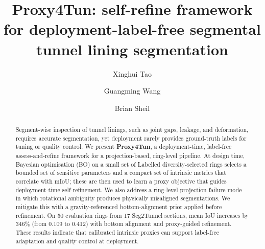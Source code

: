 \documentclass[a4paper,fleqn]{cas-dc}
\begin{document}
\let\WriteBookmarks\relax
\def\floatpagepagefraction{1}
\def\textpagefraction{.001}


{

\title[mode=title]{Proxy4Tun: self-refine framework for deployment-label-free segmental tunnel lining segmentation}

\author[1]{Xinghui Tao}

\author[1]{Guangming Wang}
\cormark[1]

\author[1]{Brian Sheil}





\begin{abstract}
Segment-wise inspection of tunnel linings, such as joint gaps, leakage, and deformation, requires accurate segmentation, yet deployment rarely provides ground-truth labels for tuning or quality control. We present \textbf{Proxy4Tun}, a deployment-time, label-free assess-and-refine framework for a projection-based, ring-level pipeline. At design time, Bayesian optimisation (BO) on a small set of Labelled diversity-selected rings selects a bounded set of sensitive parameters and a compact set of intrinsic metrics that correlate with mIoU; these are then used to learn a proxy objective that guides deployment-time self-refinement. We also address a ring-level projection failure mode in which rotational ambiguity produces physically misaligned segmentations. We mitigate this with a gravity-referenced bottom-alignment prior applied before refinement. On 50 evaluation rings from 17 Seg2Tunnel sections, mean IoU increases by 346\% (from 0.109 to 0.412) with bottom alignment and proxy-guided refinement. These results indicate that calibrated intrinsic proxies can support label-free adaptation and quality control at deployment.
\end{abstract}


}
\end{document}
